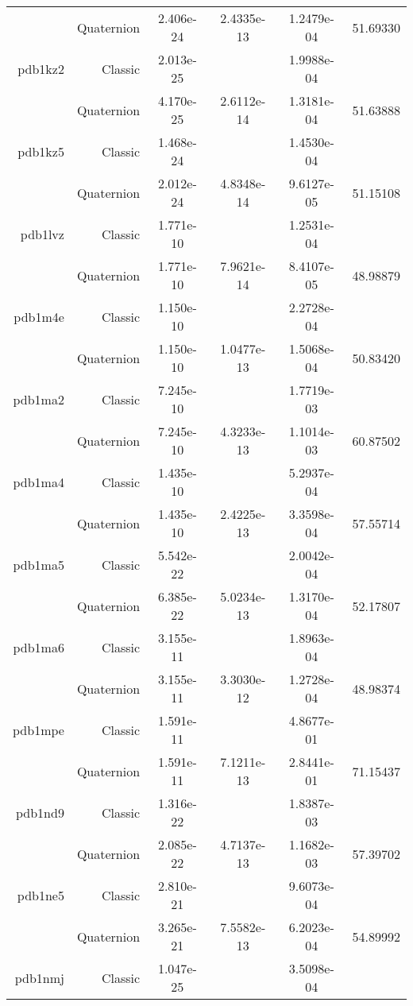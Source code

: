 \begin{xltabular}{\textwidth}{r|rS[table-format=1.3e+2]S[table-format=1.4e+2]S[table-format=1.4e+2]S[table-format=-1.5]}
& Quaternion & 2.406e-24 & 2.4335e-13 & 1.2479e-04 & 51.69330\\  \addlinespace
pdb1kz2 & Classic & 2.013e-25 &  & 1.9988e-04 & \\
& Quaternion & 4.170e-25 & 2.6112e-14 & 1.3181e-04 & 51.63888\\  \addlinespace
pdb1kz5 & Classic & 1.468e-24 &  & 1.4530e-04 & \\
& Quaternion & 2.012e-24 & 4.8348e-14 & 9.6127e-05 & 51.15108\\  \addlinespace
pdb1lvz & Classic & 1.771e-10 &  & 1.2531e-04 & \\
& Quaternion & 1.771e-10 & 7.9621e-14 & 8.4107e-05 & 48.98879\\  \addlinespace
pdb1m4e & Classic & 1.150e-10 &  & 2.2728e-04 & \\
& Quaternion & 1.150e-10 & 1.0477e-13 & 1.5068e-04 & 50.83420\\  \addlinespace
pdb1ma2 & Classic & 7.245e-10 &  & 1.7719e-03 & \\
& Quaternion & 7.245e-10 & 4.3233e-13 & 1.1014e-03 & 60.87502\\  \addlinespace
pdb1ma4 & Classic & 1.435e-10 &  & 5.2937e-04 & \\
& Quaternion & 1.435e-10 & 2.4225e-13 & 3.3598e-04 & 57.55714\\  \addlinespace
pdb1ma5 & Classic & 5.542e-22 &  & 2.0042e-04 & \\
& Quaternion & 6.385e-22 & 5.0234e-13 & 1.3170e-04 & 52.17807\\  \addlinespace
pdb1ma6 & Classic & 3.155e-11 &  & 1.8963e-04 & \\
& Quaternion & 3.155e-11 & 3.3030e-12 & 1.2728e-04 & 48.98374\\  \addlinespace
pdb1mpe & Classic & 1.591e-11 &  & 4.8677e-01 & \\
& Quaternion & 1.591e-11 & 7.1211e-13 & 2.8441e-01 & 71.15437\\  \addlinespace
pdb1nd9 & Classic & 1.316e-22 &  & 1.8387e-03 & \\
& Quaternion & 2.085e-22 & 4.7137e-13 & 1.1682e-03 & 57.39702\\  \addlinespace
pdb1ne5 & Classic & 2.810e-21 &  & 9.6073e-04 & \\
& Quaternion & 3.265e-21 & 7.5582e-13 & 6.2023e-04 & 54.89992\\  \addlinespace
pdb1nmj & Classic & 1.047e-25 &  & 3.5098e-04 & \\

\end{xltabular}
